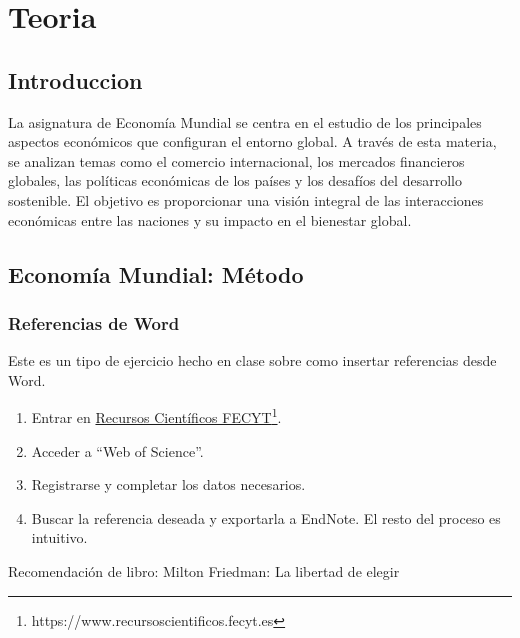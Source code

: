 \documentclass[12pt]{book} %
\begin{document}
\part{Teoria}

\hypertarget{introduccion}{%
\chapter{Introduccion}\label{introduccion}}

La asignatura de Economía Mundial se centra en el estudio de los
principales aspectos económicos que configuran el entorno global. A
través de esta materia, se analizan temas como el comercio
internacional, los mercados financieros globales, las políticas
económicas de los países y los desafíos del desarrollo sostenible. El
objetivo es proporcionar una visión integral de las interacciones
económicas entre las naciones y su impacto en el bienestar global.

\hypertarget{economuxeda-mundial-muxe9todo}{%
\chapter{Economía Mundial: Método}\label{economuxeda-mundial-muxe9todo}}

\hypertarget{referencias-de-word}{%
\section{Referencias de Word}\label{referencias-de-word}}

\begin{ejercicio}

Este es un tipo de ejercicio hecho en clase sobre como insertar referencias desde Word.

\begin{enumerate}
   \item Entrar en \href{https://www.recursoscientificos.fecyt.es}{Recursos Científicos FECYT}\footnote{https://www.recursoscientificos.fecyt.es}.
   \item Acceder a “Web of Science”.
   \item Registrarse y completar los datos necesarios.
   \item Buscar la referencia deseada y exportarla a EndNote. El resto del proceso es intuitivo.
\end{enumerate}

Recomendación de libro: Milton Friedman: La libertad de elegir

\end{ejercicio}
\end{document}
